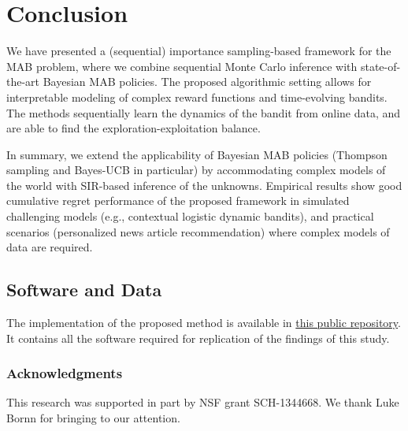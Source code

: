 \documentclass{article}
\newcommand{\eg}{e.g., }
\def\addappendix{}
\begin{document}


\section{Conclusion}
\label{sec:conclusion}

We have presented a (sequential) importance sampling-based framework for the MAB problem, where we combine sequential Monte Carlo inference with state-of-the-art Bayesian MAB policies. The proposed algorithmic setting allows for interpretable modeling of complex reward functions and time-evolving bandits. The methods sequentially learn the dynamics of the bandit from online data, and are able to find the exploration-exploitation balance.

In summary, we extend the applicability of Bayesian MAB policies (Thompson sampling and Bayes-UCB in particular) by accommodating complex models of the world with SIR-based inference of the unknowns. Empirical results show good cumulative regret performance of the proposed framework in simulated challenging models (\eg contextual logistic dynamic bandits), and practical scenarios (personalized news article recommendation) where complex models of data are required.

\subsection{Software and Data}
The implementation of the proposed method is available in \href{https://github.com/iurteaga/bandits}{this public repository}. It contains all the software required for replication of the findings of this study.

\subsubsection*{Acknowledgments}
This research was supported in part by NSF grant SCH-1344668.
We thank Luke Bornn for bringing \cite{j-Cherkassky2013}  to our attention.




\ifx\addappendix\undefined 
\end{document}
